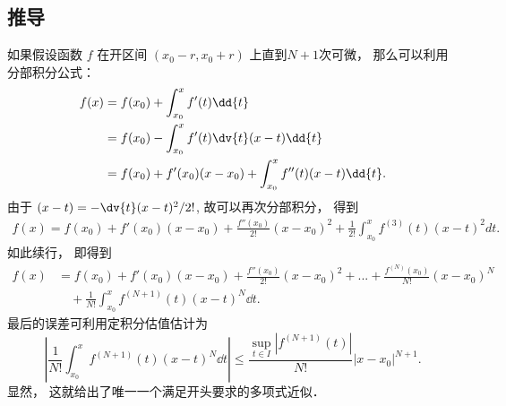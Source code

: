 \subsection{推导}
如果假设函数 $f$ 在开区间 $(x_0-r,x_0+r)$ 上直到$N+1$次可微， 那么可以利用分部积分公式：
\begin{equation}
\begin{aligned}
f(x)
&=f(x_0)+\int_{x_0}^{x}f'(t)\dd{t}\\
&=f(x_0)-\int_{x_0}^{x}f'(t)\dv{t}(x-t) \dd{t}\\
&=f(x_0)+f'(x_0)(x-x_0)+\int_{x_0}^{x}f''(t)(x-t) \dd{t}.
\end{aligned}
\end{equation}
由于 $(x-t)=-\dv{t} (x-t)^2/2!$, 故可以再次分部积分， 得到
\begin{equation}
\begin{aligned}
f(x)
=f(x_0)+f'(x_0)(x-x_0)+\frac{f''(x_0)}{2!}(x-x_0)^2
+\frac{1}{2!}\int_{x_0}^{x}f^{(3)}(t)(x-t)^2dt.
\end{aligned}
\end{equation}
如此续行， 即得到
\begin{equation}
\begin{aligned}
f(x)
&=f(x_0)+f'(x_0)(x-x_0)+\frac{f''(x_0)}{2!}(x-x_0)^2+...+\frac{f^{(N)}(x_0)}{N!}(x-x_0)^N\\
&\quad+\frac{1}{N!}\int_{x_0}^{x}f^{(N+1)}(t)(x-t)^{N} \dd{t}.
\end{aligned}
\end{equation}
最后的误差可利用定积分估值估计为
\begin{equation}
\left|\frac{1}{N!}\int_{x_0}^{x}f^{(N+1)}(t)(x-t)^{N} \dd{t} \right|
\leq\frac{\sup_{t\in I}|f^{(N+1)}(t)|}{N!}|x-x_0|^{N+1}.
\end{equation}
显然， 这就给出了唯一一个满足开头要求的多项式近似．